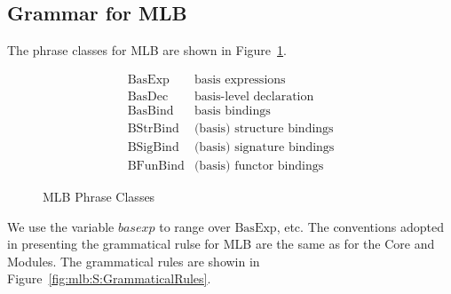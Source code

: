 \documentclass[draft]{article}
\renewcommand{\mit}[1]{\mathit{#1}}
\newcommand{\mrm}[1]{\mathrm{#1}}
\begin{document}
\subsection{Grammar for MLB}
The phrase classes for MLB are shown in
Figure~\ref{fig:mlb:S:PhraseClasses}.
\begin{figure}[h]
\begin{displaymath}
\begin{array}{ll}
\mrm{BasExp} & \mbox{basis expressions} \\
\mrm{BasDec} & \mbox{basis-level declaration} \\
\mrm{BasBind} & \mbox{basis bindings} \\
\mrm{BStrBind} & \mbox{(basis) structure bindings} \\
\mrm{BSigBind} & \mbox{(basis) signature bindings} \\
\mrm{BFunBind} & \mbox{(basis) functor bindings}
\end{array}
\end{displaymath}
\caption{MLB Phrase Classes}\label{fig:mlb:S:PhraseClasses}
\end{figure}
We use the variable $\mit{basexp}$ to range over $\mrm{BasExp}$, etc.
The conventions adopted in presenting the grammatical rulse for MLB
are the same as for the Core and Modules.  The grammatical rules are
showin in Figure~\ref{fig:mlb:S:GrammaticalRules}.
\end{document}
